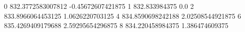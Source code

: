 0 832.3772583007812 -0.45672607421875
1 832.833984375 0.0
2 833.8966064453125 1.0626220703125
4 834.8590698242188 2.02508544921875
6 835.4269409179688 2.59295654296875
8 834.220458984375 1.386474609375
